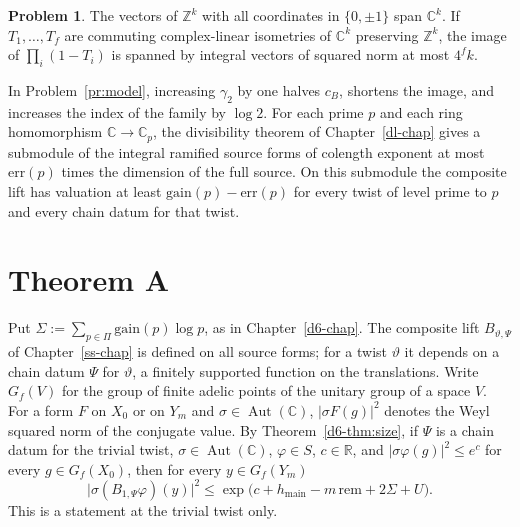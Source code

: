 \documentclass[reqno]{amsart}
\newcounter{chap}
\theoremstyle{definition}
\newtheorem{problem}{Problem}[section]
\theoremstyle{plain}
\theoremstyle{definition}
\newcommand{\Z}{\mathbb{Z}}
\newcommand{\R}{\mathbb{R}}
\newcommand{\C}{\mathbb{C}}
\newcommand{\gain}{\mathrm{gain}}
\newcommand{\err}{\mathrm{err}}
\newcommand{\rem}{\mathrm{rem}}
\newcommand{\hm}{h_{\mathrm{main}}}
\newcommand{\Aut}{\operatorname{Aut}}
\begin{document}
\begin{problem}\label{pr:short-span}
The vectors of \(\Z^k\) with all coordinates in \(\{0, \pm1\}\) span \(\C^k\).  If \(T_1, \dots, T_f\) are commuting complex-linear isometries of \(\C^k\) preserving \(\Z^k\), the image of \(\prod_i(1 - T_i)\) is spanned by integral vectors of squared norm at most \(4^f k\).
\end{problem}

In Problem~\ref{pr:model}, increasing \(\gamma_2\) by one halves \(c_B\), shortens the image, and increases the index of the family by \(\log 2\).  For each prime \(p\) and each ring homomorphism \(\C \to \C_p\), the divisibility theorem of Chapter~\ref{dl-chap} gives a submodule of the integral ramified source forms of colength exponent at most \(\err(p)\) times the dimension of the full source.  On this submodule the composite lift has valuation at least \(\gain(p) - \err(p)\) for every twist of level prime to \(p\) and every chain datum for that twist.

\section{Theorem A}\label{sec:theorem-a}

Put \(\Sigma := \sum_{p \in \Pi}\gain(p)\log p\), as in Chapter~\ref{d6-chap}.  The composite lift \(B_{\vartheta,\Psi}\) of Chapter~\ref{ss-chap} is defined on all source forms; for a twist \(\vartheta\) it depends on a chain datum \(\Psi\) for \(\vartheta\), a finitely supported function on the translations.  Write \(G_f(V)\) for the group of finite adelic points of the unitary group of a space \(V\).  For a form \(F\) on \(X_0\) or on \(Y_m\) and \(\sigma \in \Aut(\C)\), \(\lvert\sigma F(g)\rvert^2\) denotes the Weyl squared norm of the conjugate value.  By Theorem~\ref{d6-thm:size}, if \(\Psi\) is a chain datum for the trivial twist, \(\sigma \in \Aut(\C)\), \(\varphi \in S\), \(c \in \R\), and \(\lvert\sigma\varphi(g)\rvert^2 \le e^c\) for every \(g \in G_f(X_0)\), then for every \(y \in G_f(Y_m)\)
\[
  \lvert\sigma(B_{1,\Psi}\varphi)(y)\rvert^2 \le \exp\bigl(c + \hm - m\,\rem + 2\Sigma + U\bigr) .
\]
This is a statement at the trivial twist only.
\end{document}
